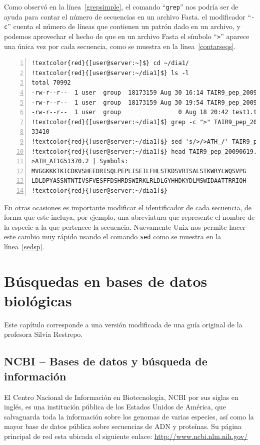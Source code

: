 \documentclass[letter,11pt]{book}
\begin{document}
Como observó en la línea~\ref{grepsimple}, el comando ``\Verb+grep+'' nos podría ser de ayuda para contar el número de secuencias en un archivo Fasta. el modificador ``\Verb+-c+'' cuenta el número de líneas que contienen un patrón dado en un archivo, y podemos aprovechar el hecho de que en un archivo Fasta el símbolo ``\Verb+>+'' aparece una única vez por cada secuencia, como se muestra en la línea~\ref{contarseqs}.

\begin{Verbatim}[commandchars=!\{\},numbers=left,firstnumber=last,label=Usando comandos Unix con archivos Fasta,frame=topline,fontsize=\scriptsize]
!textcolor{red}{[user@server:~]$} cd ~/dia1/
!textcolor{red}{[user@server:~/dia1]$} ls -l
total 70992
-rw-r--r--  1 user  group  18173159 Aug 30 16:14 TAIR9_pep_20090619
-rw-r--r--  1 user  group  18173159 Aug 30 19:54 TAIR9_pep_20090619.lc
-rw-r--r--  1 user  group                0 Aug 18 20:42 test1.txt
!textcolor{red}{[user@server:~/dia1]$} grep -c ">" TAIR9_pep_20090619 !label{contarseqs}
33410
!textcolor{red}{[user@server:~/dia1]$} sed 's/>/>ATH_/' TAIR9_pep_20090619 > TAIR9_pep_20090619.mod !label{sedsp}
!textcolor{red}{[user@server:~/dia1]$} head TAIR9_pep_20090619.mod
>ATH_AT1G51370.2 | Symbols: 
MVGGKKKTKICDKVSHEEDRISQLPEPLISEILFHLSTKDSVRTSALSTKWRYLWQSVPG
LDLDPYASSNTNTIVSFVESFFDSHRDSWIRKLRLDLGYHHDKYDLMSWIDAATTRRIQH
!textcolor{red}{[user@server:~/dia1]$}
\end{Verbatim} 

En otras ocasiones es importante modificar el identificador de cada secuencia, de forma que este incluya, por ejemplo, una abreviatura que represente el nombre de la especie a la que pertenece la secuencia. Nuevamente Unix nos permite hacer este cambio muy rápido usando el comando \Verb+sed+ como se muestra en la línea~\ref{sedsp}.

\chapter{Búsquedas en bases de datos biológicas}

Este capítulo corresponde a una versión modificada de una guía original de la profesora Silvia Restrepo.

\section{NCBI – Bases de datos y búsqueda de información}

El Centro Nacional de Información en Biotecnología, NCBI por sus siglas en inglés, es una institución pública de los Estados Unidos de América, que salvaguarda toda la información sobre los genomas de varias especies, así como la mayor base de datos pública sobre secuencias de ADN y proteínas.  Su página principal de red esta ubicada el siguiente enlace: \url{http://www.ncbi.nlm.nih.gov/}
\end{document}
